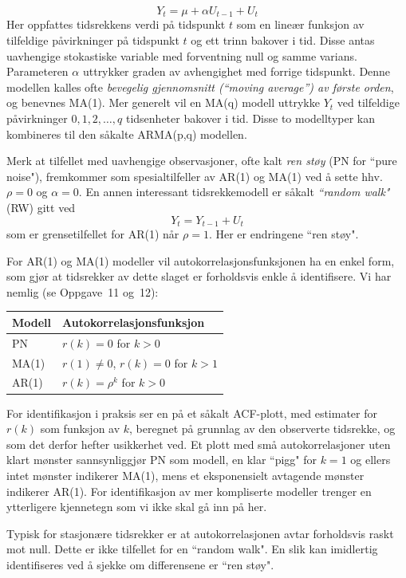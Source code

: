 \[ Y_t= \mu +\alpha U_{t-1} + U_t       \]
Her oppfattes tidsrekkens verdi på tidspunkt $t$ som en lineær 
funksjon av tilfeldige påvirkninger på tidspunkt $t$ og ett trinn
bakover i tid. Disse antas uavhengige stokastiske variable med
forventning null og samme varians.  Parameteren $\alpha$ uttrykker graden av
avhengighet med forrige tidspunkt.
Denne modellen kalles ofte {\em bevegelig gjennomsnitt (``moving average'')
av første orden}, og benevnes MA(1). Mer generelt vil en MA(q) modell 
 uttrykke $Y_t$ ved tilfeldige påvirkninger $0,1,2,\ldots ,q$ tidsenheter
bakover i tid.
Disse to modelltyper kan kombineres til den såkalte ARMA(p,q) modellen.

Merk at tilfellet med uavhengige observasjoner, ofte kalt {\em ren støy}
(PN for ``pure noise"), fremkommer som spesialtilfeller av AR(1) og MA(1) ved å sette hhv. 
$\rho=0$ og $\alpha=0$. En annen interessant tidsrekkemodell er såkalt
\emph{``random walk"}(RW) gitt ved
\[ Y_t = Y_{t-1} + U_t       \]
som er grensetilfellet for AR(1) når $\rho=1$. Her er endringene ``ren
støy". 

For AR(1) og MA(1) modeller vil autokorrelasjonsfunksjonen ha en enkel form,
som gjør at tidsrekker av dette slaget er forholdsvis enkle å
identifisere. Vi har nemlig (se Oppgave~11 og~12):
\begin{center}
\begin{tabular}{ll}
Modell & Autokorrelasjonsfunksjon \\ \hline
PN     & $r(k)=0$ for $k>0$  \\
MA(1)  & $r(1)\neq 0$, $r(k)=0$ for $k>1$  \\
AR(1)  & $r(k)={\rho}^k$ for $k>0$  \\ \hline                              
\end{tabular}
\end{center}
For identifikasjon i praksis ser en på et såkalt ACF-plott, med estimater for
$r(k)$ som funksjon av $k$, beregnet på grunnlag av den observerte 
tidsrekke, og som det derfor hefter usikkerhet ved.
Et plott med små autokorrelasjoner uten klart mønster sannsynliggjør
PN som modell, en klar ``pigg" for $k=1$ og ellers intet mønster 
indikerer MA(1), mens et eksponensielt avtagende mønster indikerer AR(1).
For identifikasjon av mer kompliserte modeller trenger en ytterligere kjennetegn
som vi ikke skal gå inn på her.

Typisk for stasjonære tidsrekker er at autokorrelasjonen avtar 
forholdsvis raskt mot null. Dette er ikke tilfellet for en ``random walk".
En slik kan imidlertig identifiseres ved å sjekke om differensene er
``ren støy".\\

